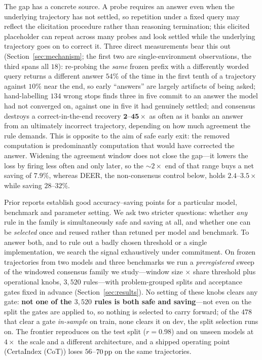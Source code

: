 The gap has a concrete source. A probe requires an answer even when the
underlying trajectory has not settled, so repetition under a fixed query may
reflect the elicitation procedure rather than reasoning termination; this
elicited placeholder can repeat across many probes and look settled while the
underlying trajectory goes on to correct
it. Three direct measurements bear this out (Section~\ref{sec:mechanism}; the
first two are single-environment observations, the third spans all $18$):
re-probing the \emph{same} frozen prefix with a differently worded query returns a
different answer $54\%$ of the time in the first tenth of a trajectory against
$10\%$ near the end, so early ``answers'' are largely artifacts of being asked;
hand-labelling $134$ wrong stops finds three in five commit to an answer the model
had not converged on, against one in five it had genuinely settled; and consensus
destroys a correct-in-the-end recovery $\mathbf{2}$--$\mathbf{45}\times$ as
often as it banks an answer from an ultimately incorrect trajectory, depending
on how much agreement the rule demands. This is opposite to the aim of safe
early exit: the removed computation is predominantly computation that would have
corrected the answer. Widening the agreement window does not close the gap---it
lowers the loss by firing less often and only later, so the ${\sim}2\times$ end
of that range buys a net saving of $7.9\%$, whereas DEER, the non-consensus
control below, holds $2.4$--$3.5\times$ while saving $28$--$32\%$.

Prior reports establish good accuracy--saving points for a particular model,
benchmark and parameter setting. We ask two stricter questions: whether
\emph{any} rule in the family is simultaneously safe and saving at all, and
whether one can be \emph{selected} once and reused rather than retuned per model
and benchmark. To answer both, and to rule out a badly chosen threshold or a
single implementation, we search the signal exhaustively under commitment. On frozen trajectories from two
models and three benchmarks we run a \emph{preregistered} sweep of the windowed
consensus family we study---window size $\times$ share threshold plus operational
knobs, $3{,}520$ rules---with problem-grouped splits and acceptance gates fixed in
advance (Section~\ref{sec:results}). No setting of these knobs
clears any gate: \textbf{not one of the $3{,}520$ rules is both safe and
saving}---not even on the split the gates are applied to, so nothing is
selected to carry forward; of the $478$ that clear a gate \emph{in-sample} on
train, none clears it on dev, the split selection runs on. The frontier reproduces on the test
split ($r{=}0.98$) and on unseen models at $4\times$ the scale and a different
architecture, and a shipped operating point (CertaIndex (CoT)) loses
$56$--$70\,\text{pp}$ on the same trajectories.

